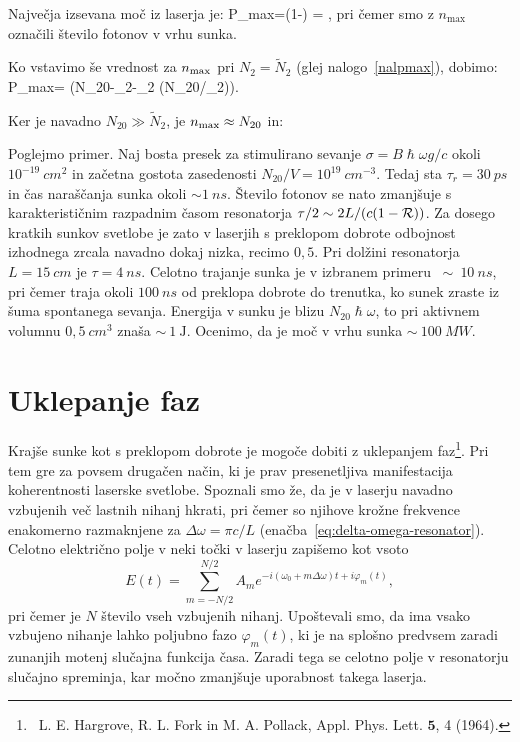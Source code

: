 Največja izsevana moč iz laserja je: 
\beq
P_{\rm max}=\left(1-\right) = 
,
\eeq
pri čemer smo z $n_\textrm{max}$ označili število fotonov v vrhu sunka.

Ko vstavimo še vrednost za $n_{\rm max}$ pri $N_{2}=\tilde{N}_{2}$ (glej 
nalogo~\ref{nalpmax}), dobimo:
\beq
P_{\rm max}=\frac {2\hslash \omega}{\tau} \left(N_{20}-_{2}-_{2}
\ln (N_{20}/_{2})\right).
\eeq

Ker je navadno $N_{20}\gg \tilde{N}_2$, je $n_{\rm max} \approx N_{20}$
in:

Poglejmo primer. Naj bosta presek za stimulirano sevanje $\sigma=B\hslash \omega g/c$ 
okoli $10^{-19}~\si{cm}^{2}$ in začetna gostota zasedenosti $N_{20}/V=10^{19}~\si{cm}^{-3}$.
Tedaj sta $\tau_{r}=30~\si{ps}$ in čas naraščanja
sunka okoli $\sim 1~\si{ns}$. Število fotonov se nato zmanjšuje s
karakterističnim razpadnim časom resonatorja $\tau /2\sim 2L/(c(1-{\cal R}))$. 
Za dosego kratkih sunkov svetlobe je zato v laserjih s preklopom dobrote odbojnost 
izhodnega zrcala navadno dokaj nizka, recimo $0,5$. Pri dolžini resonatorja 
$L=15~\si{cm}$ je $\tau=4~\si{ns}$.
Celotno trajanje sunka je v izbranem primeru $~\sim~10~\si{ns}$, pri
čemer traja okoli $100~\si{ns}$ od preklopa dobrote do trenutka, ko sunek zraste iz šuma
spontanega sevanja. Energija v sunku je blizu $N_{20}\hslash \omega $, to pri
aktivnem volumnu $0,5~\si{cm}^3$ znaša $\sim~1~\si{\joule}$. Ocenimo, da je
moč v vrhu sunka $\sim~100~\si{MW}$.

\section{Uklepanje faz}
\label{chap:Uklepanje}
Krajše sunke kot s preklopom dobrote je mogoče dobiti z uklepanjem 
faz\footnote{~L. E. Hargrove, R. L. Fork in M. A. Pollack, Appl. Phys. Lett. $\mathbf{5}$, 4 (1964).}.
Pri tem gre za povsem drugačen način, ki je prav presenetljiva manifestacija 
koherentnosti laserske svetlobe. Spoznali smo že, da je v laserju navadno 
vzbujenih več lastnih nihanj hkrati, pri čemer so njihove krožne frekvence 
enakomerno razmaknjene za $\Delta \omega =\pi c/L$ 
(enačba~\ref{eq:delta-omega-resonator}). Celotno električno
polje v neki točki v laserju zapišemo kot vsoto 
\begin{equation}
E(t)=\sum_{m=-N/2}^{N/2}A_{m}e^{-i(\omega _{0}+m\Delta \omega )t+i\varphi
_{m}(t)},
\label{5.342}
\end{equation}
pri čemer je $N$ število vseh vzbujenih nihanj. Upoštevali smo, da ima vsako
vzbujeno nihanje lahko poljubno fazo $\varphi _{m}(t)$, ki je na splošno predvsem
zaradi zunanjih motenj slučajna funkcija časa. Zaradi tega se
celotno polje v resonatorju slučajno spreminja, kar močno zmanjšuje uporabnost
takega laserja.

